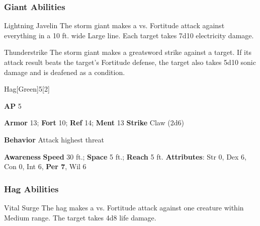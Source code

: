 \subsubsection{Giant Abilities}

\begin{freeability}{Lightning Javelin}
The storm giant makes a  vs. Fortitude attack against everything in a 10 ft. wide Large line.
\hit Each target takes 7d10 electricity damage.
\end{freeability}

\vspace{0.5em}
\begin{freeability}{Thunderstrike}
The storm giant makes a greatsword strike against a target.
If its attack result beats the target's Fortitude defense,
the target also takes 5d10 sonic damage
and is deafened as a condition.
\end{freeability}

\begin{monsection}{Hag}[Green]{5}[2]
\vspace{-1em}\vspace{-1em}
\begin{spellcontent}
\begin{spelltargetinginfo}
{\textbf{AP} 5}

\pari \textbf{Armor} 13;
\textbf{Fort} 10;
\textbf{Ref} 14;
\textbf{Ment} 13
\pari \textbf{Strike} Claw  (2d6)



\pari \textbf{Behavior} Attack highest threat
\end{spelltargetinginfo}
\end{spellcontent}

\begin{monsterfooter}
\pari \textbf{Awareness} 
\pari \textbf{Speed} 30 ft.;
\textbf{Space} 5 ft.;
\textbf{Reach} 5 ft.
\pari \textbf{Attributes}:
Str 0,
Dex 6,
Con 0,
Int 6,
\textbf{Per 7},
Wil 6
\end{monsterfooter}
\end{monsection}


\subsubsection{Hag Abilities}

\begin{freeability}{Vital Surge}
The hag makes a  vs. Fortitude attack against one creature within Medium range.
\hit The target takes 4d8 life damage.
\end{freeability}


